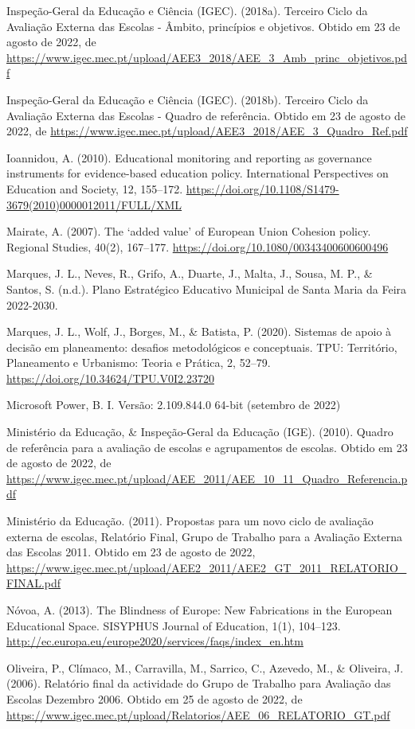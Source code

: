 \documentclass[
]{book}
\begin{document}
Inspeção-Geral da Educação e Ciência (IGEC). (2018a). Terceiro Ciclo da Avaliação Externa das Escolas - Âmbito, princípios e objetivos. Obtido em 23 de agosto de 2022, de \url{https://www.igec.mec.pt/upload/AEE3_2018/AEE_3_Amb_princ_objetivos.pdf}

Inspeção-Geral da Educação e Ciência (IGEC). (2018b). Terceiro Ciclo da Avaliação Externa das Escolas - Quadro de referência. Obtido em 23 de agosto de 2022, de \url{https://www.igec.mec.pt/upload/AEE3_2018/AEE_3_Quadro_Ref.pdf}

Ioannidou, A. (2010). Educational monitoring and reporting as governance instruments for evidence-based education policy. International Perspectives on Education and Society, 12, 155--172. \url{https://doi.org/10.1108/S1479-3679(2010)0000012011/FULL/XML}

Mairate, A. (2007). The `added value' of European Union Cohesion policy. Regional Studies, 40(2), 167--177. \url{https://doi.org/10.1080/00343400600600496}

Marques, J. L., Neves, R., Grifo, A., Duarte, J., Malta, J., Sousa, M. P., \& Santos, S. (n.d.). Plano Estratégico Educativo Municipal de Santa Maria da Feira 2022-2030.

Marques, J. L., Wolf, J., Borges, M., \& Batista, P. (2020). Sistemas de apoio à decisão em planeamento: desafios metodológicos e conceptuais. TPU: Território, Planeamento e Urbanismo: Teoria e Prática, 2, 52--79. \url{https://doi.org/10.34624/TPU.V0I2.23720}

Microsoft Power, B. I. Versão: 2.109.844.0 64-bit (setembro de 2022)

Ministério da Educação, \& Inspeção-Geral da Educação (IGE). (2010). Quadro de referência para a avaliação de escolas e agrupamentos de escolas. Obtido em 23 de agosto de 2022, de \url{https://www.igec.mec.pt/upload/AEE_2011/AEE_10_11_Quadro_Referencia.pdf}

Ministério da Educação. (2011). Propostas para um novo ciclo de avaliação externa de escolas, Relatório Final, Grupo de Trabalho para a Avaliação Externa das Escolas 2011. Obtido em 23 de agosto de 2022, \url{https://www.igec.mec.pt/upload/AEE2_2011/AEE2_GT_2011_RELATORIO_FINAL.pdf}

Nóvoa, A. (2013). The Blindness of Europe: New Fabrications in the European Educational Space. SISYPHUS Journal of Education, 1(1), 104--123. \url{http://ec.europa.eu/europe2020/services/faqs/index_en.htm}

Oliveira, P., Clímaco, M., Carravilla, M., Sarrico, C., Azevedo, M., \& Oliveira, J. (2006). Relatório final da actividade do Grupo de Trabalho para Avaliação das Escolas Dezembro 2006. Obtido em 25 de agosto de 2022, de \url{https://www.igec.mec.pt/upload/Relatorios/AEE_06_RELATORIO_GT.pdf}
\end{document}
